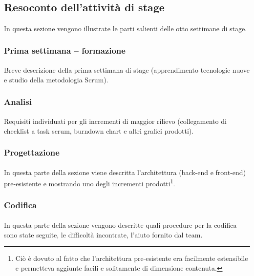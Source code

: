 \documentclass[
article,
10pt, %
oneside, %
BCOR5mm, %
]{scrartcl}
\begin{document}
\subsection{Resoconto dell'attività di stage}
\paragraph{} In questa sezione vengono illustrate le parti salienti delle otto
settimane di stage.

\subsubsection{Prima settimana -- formazione}
\paragraph{} Breve descrizione della prima settimana di stage (apprendimento
tecnologie nuove e studio della metodologia Scrum).

\subsubsection{Analisi}
\paragraph{} Requisiti individuati per gli incrementi di maggior rilievo
(collegamento di checklist a task scrum, burndown chart e altri grafici
prodotti).

\subsubsection{Progettazione}
\paragraph{} In questa parte della sezione viene descritta l'architettura
(back-end e front-end) pre-esistente e mostrando uno degli incrementi
prodotti\footnote{Ciò è dovuto al fatto che l'architettura pre-esistente era
facilmente estensibile e permetteva aggiunte facili e solitamente di
dimensione contenuta.}.

\subsubsection{Codifica}
\paragraph{} In questa parte della sezione vengono descritte quali procedure
per la codifica sono state seguite, le difficoltà incontrate, l'aiuto fornito
dal team.
\end{document}
